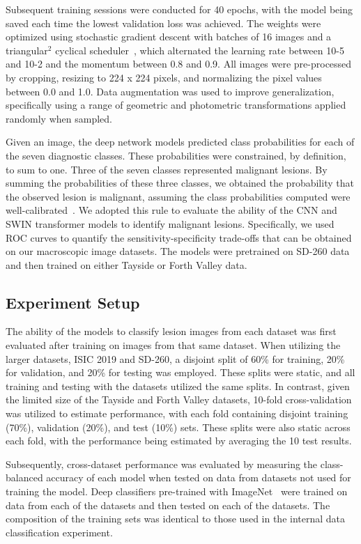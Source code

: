 Subsequent training sessions were conducted for 40 epochs, with the model being saved each time the lowest validation loss was achieved. The weights were optimized using stochastic gradient descent with batches of 16 images and a triangular$^2$ cyclical scheduler~\citep{smith2017cyclical}, which alternated the learning rate between 10-5 and 10-2 and the momentum between 0.8 and 0.9. All images were pre-processed by cropping, resizing to 224 x 224 pixels, and normalizing the pixel values between 0.0 and 1.0. Data augmentation was used to improve generalization, specifically using a range of geometric and photometric transformations applied randomly when sampled.

Given an image, the deep network models predicted class probabilities for each of the seven diagnostic classes. These probabilities were constrained, by definition, to sum to one. Three of the seven classes represented malignant lesions. By summing the probabilities of these three classes, we obtained the probability that the observed lesion is malignant, assuming the class probabilities computed were well-calibrated~\citep{carse2022calibration}. We adopted this rule to evaluate the ability of the CNN and SWIN transformer models to identify malignant lesions. Specifically, we used ROC curves to quantify the sensitivity-specificity trade-offs that can be obtained on our macroscopic image datasets. The models were pretrained on SD-260 data and then trained on either Tayside or Forth Valley data.

\subsection{Experiment Setup}
\label{subsec:generalisation_experiment}
The ability of the models to classify lesion images from each dataset was first evaluated after training on images from that same dataset. When utilizing the larger datasets, ISIC 2019 and SD-260, a disjoint split of 60\% for training, 20\% for validation, and 20\% for testing was employed. These splits were static, and all training and testing with the datasets utilized the same splits. In contrast, given the limited size of the Tayside and Forth Valley datasets, 10-fold cross-validation was utilized to estimate performance, with each fold containing disjoint training (70\%), validation (20\%), and test (10\%) sets. These splits were also static across each fold, with the performance being estimated by averaging the 10 test results.

Subsequently, cross-dataset performance was evaluated by measuring the class-balanced accuracy of each model when tested on data from datasets not used for training the model. Deep classifiers pre-trained with ImageNet~\citep{deng2009imagenet} were trained on data from each of the datasets and then tested on each of the datasets. The composition of the training sets was identical to those used in the internal data classification experiment.

